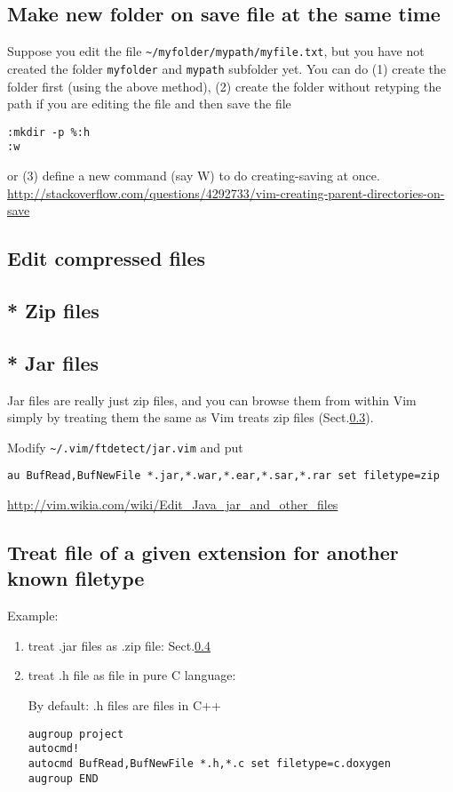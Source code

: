 \subsection{Make new folder on save file at the same time}

Suppose you edit the file \verb!~/myfolder/mypath/myfile.txt!, but you have not
created the folder \verb!myfolder! and \verb!mypath! subfolder yet. You can do
(1) create the folder first (using the above method), (2) create the folder
without retyping the path if you are editing the file and then save the file
\begin{verbatim}
:mkdir -p %:h
:w
\end{verbatim}
or (3) define a new command (say W) to do creating-saving at once. 
\url{http://stackoverflow.com/questions/4292733/vim-creating-parent-directories-on-save}


\subsection{Edit compressed files}

\subsection{ * Zip files}
\label{sec:zip_files}

\subsection{ * Jar files}
\label{sec:jar_files}

Jar files are really just zip files, and you can browse them from within Vim
simply by treating them the same as Vim treats zip files
(Sect.\ref{sec:zip_files}).

Modify \verb!~/.vim/ftdetect/jar.vim!
and put
\begin{verbatim}
au BufRead,BufNewFile *.jar,*.war,*.ear,*.sar,*.rar set filetype=zip
\end{verbatim}
\url{http://vim.wikia.com/wiki/Edit_Java_jar_and_other_files}

\subsection{Treat file of a given extension for another known filetype}

Example:
\begin{enumerate}
  \item treat .jar files as .zip file: Sect.\ref{sec:jar_files}
  
  \item treat .h file as file in pure C language:

By default: .h files are files in C++	
\begin{verbatim}
augroup project
autocmd!
autocmd BufRead,BufNewFile *.h,*.c set filetype=c.doxygen
augroup END
\end{verbatim}
\end{enumerate}

